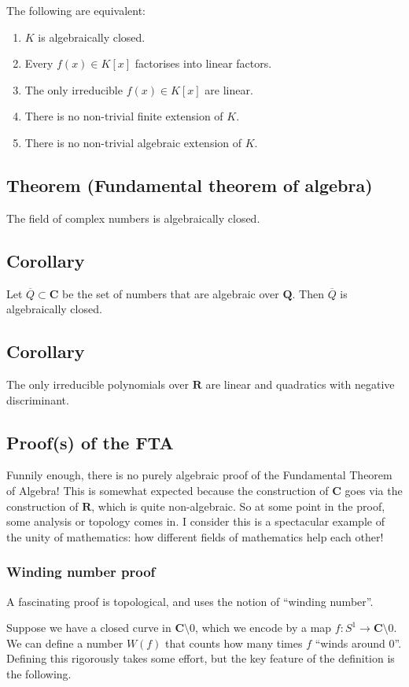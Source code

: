 \documentclass[11pt]{article}
\begin{document}
The following are equivalent:
\begin{enumerate}
\item \(K\) is algebraically closed.
\item Every \(f(x) \in K[x]\) factorises into linear factors.
\item The only irreducible \(f(x) \in K[x]\) are linear.
\item There is no non-trivial finite extension of \(K\).
\item There is no non-trivial algebraic extension of \(K\).
\end{enumerate}
\subsection{Theorem (Fundamental theorem of algebra)}
\label{sec:org639bae9}
The field of complex numbers is algebraically closed.
\subsection{Corollary}
\label{sec:orgce363a5}
Let \(\overline Q \subset \mathbf{C}\) be the set of numbers that are algebraic over \(\mathbf{Q}\).
Then \(\overline Q\) is algebraically closed.
\subsection{Corollary}
\label{sec:orgca4c82c}
The only irreducible polynomials over \(\mathbf{R}\) are linear and quadratics with negative discriminant.
\subsection{Proof(s) of the FTA}
\label{sec:orgee9f638}
Funnily enough, there is no purely algebraic proof of the Fundamental Theorem of Algebra!
This is somewhat expected because the construction of \(\mathbf{C}\) goes via the construction of \(\mathbf{R}\), which is quite non-algebraic.
So at some point in the proof, some analysis or topology comes in.
I consider this is a spectacular example of the unity of mathematics: how different fields of mathematics help each other!
\subsubsection{Winding number proof}
\label{sec:org2b8cc7a}
A fascinating proof is topological, and uses the notion of ``winding number''.

Suppose we have a closed curve in \(\mathbf{C} \setminus 0\), which we encode by a map \(f \colon S^1 \to \mathbf{C} \setminus 0\).
We can define a number \(W(f)\) that counts how many times \(f\) ``winds around 0''.
Defining this rigorously takes some effort, but the key feature of the definition is the following.
\end{document}
